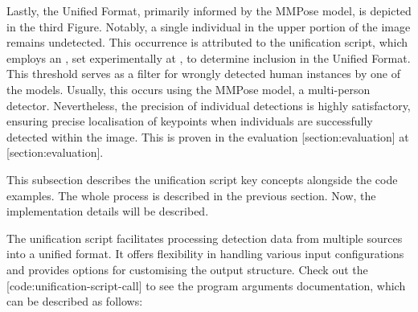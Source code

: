 Lastly, the Unified Format, primarily informed by the MMPose model, is depicted in the third Figure. Notably, a single individual in the upper portion of the image remains undetected. This occurrence is attributed to the unification script, which employs an , set experimentally at , to determine inclusion in the Unified Format. This threshold serves as a filter for wrongly detected human instances by one of the models. Usually, this occurs using the MMPose model, a multi-person detector. Nevertheless, the precision of individual detections is highly satisfactory, ensuring precise localisation of keypoints when individuals are successfully detected within the image. This is proven in the evaluation [section:evaluation] at [section:evaluation].

This subsection describes the unification script key concepts alongside the code examples. The whole process is described in the previous section. Now, the implementation details will be described.


The unification script facilitates processing detection data from multiple sour\-ces into a unified format. It offers flexibility in handling various input configurations and provides options for customising the output structure. Check out the [code:unification-script-call] to see the program arguments documentation, which can be described as follows:

